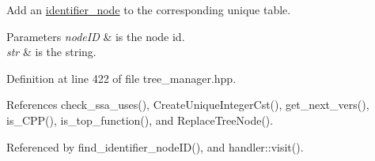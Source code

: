 Add an \hyperlink{structidentifier__node}{identifier\+\_\+node} to the corresponding unique table. 


\begin{DoxyParams}{Parameters}
{\em node\+ID} & is the node id. \\
\hline
{\em str} & is the string. \\
\hline
\end{DoxyParams}


Definition at line 422 of file tree\+\_\+manager.\+hpp.



References check\+\_\+ssa\+\_\+uses(), Create\+Unique\+Integer\+Cst(), get\+\_\+next\+\_\+vers(), is\+\_\+\+C\+P\+P(), is\+\_\+top\+\_\+function(), and Replace\+Tree\+Node().



Referenced by find\+\_\+identifier\+\_\+node\+I\+D(), and handler\+::visit().

